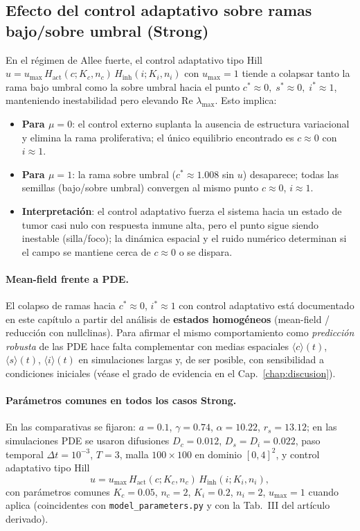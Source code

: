 \subsection{Efecto del control adaptativo sobre ramas bajo/sobre umbral (Strong)}
En el régimen de Allee fuerte, el control adaptativo tipo Hill
$u=u_{\max}\,H_{\mathrm{act}}(c;K_c,n_c)\,H_{\mathrm{inh}}(i;K_i,n_i)$ con $u_{\max}=1$
tiende a colapsar tanto la rama bajo umbral como la sobre umbral hacia el punto
$c^*\approx0,\;s^*\approx0,\;i^*\approx1$, manteniendo inestabilidad pero elevando Re $\lambda_{\max}$.
Esto implica:
\begin{itemize}
  \item \textbf{Para $\mu=0$}: el control externo suplanta la ausencia de estructura variacional y elimina la rama proliferativa; el único equilibrio encontrado es $c\approx0$ con $i\approx1$.
  \item \textbf{Para $\mu=1$}: la rama sobre umbral ($c^*\approx1.008$ sin $u$) desaparece; todas las semillas (bajo/sobre umbral) convergen al mismo punto $c\approx0$, $i\approx1$.
  \item \textbf{Interpretación}: el control adaptativo fuerza el sistema hacia un estado de tumor casi nulo con respuesta inmune alta, pero el punto sigue siendo inestable (silla/foco); la dinámica espacial y el ruido numérico determinan si el campo se mantiene cerca de $c\approx0$ o se dispara.
\end{itemize}

\paragraph{Mean-field frente a PDE.} El colapso de ramas hacia $c^*\approx0$, $i^*\approx1$ con control adaptativo está documentado en este capítulo a partir del análisis de \textbf{estados homogéneos} (mean-field / reducción con nullclinas). Para afirmar el mismo comportamiento como \emph{predicción robusta} de las PDE hace falta complementar con medias espaciales $\langle c\rangle(t)$, $\langle s\rangle(t)$, $\langle i\rangle(t)$ en simulaciones largas y, de ser posible, con sensibilidad a condiciones iniciales (véase el grado de evidencia en el Cap.~\ref{chap:discusion}).

\paragraph{Parámetros comunes en todos los casos Strong.} En las comparativas se fijaron: $a=0.1$, $\gamma=0.74$, $\alpha=10.22$, $r_s=13.12$; en las simulaciones PDE se usaron difusiones $D_c=0.012$, $D_s=D_i=0.022$, paso temporal $\Delta t=10^{-3}$, $T=3$, malla $100\times100$ en dominio $[0,4]^2$, y control adaptativo tipo Hill
\begin{equation}
u=u_{\max}\,H_{\mathrm{act}}(c;K_c,n_c)\,H_{\mathrm{inh}}(i;K_i,n_i),
\end{equation}
con parámetros comunes $K_c=0.05$, $n_c=2$, $K_i=0.2$, $n_i=2$, $u_{\max}=1$ cuando aplica (coincidentes con \texttt{model\_parameters.py} y con la Tab.~III del artículo derivado).

